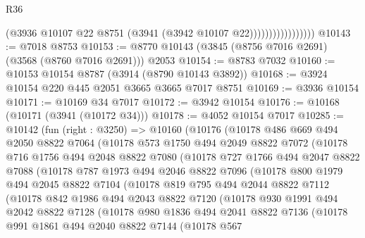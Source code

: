 \begin{lexlean}{R36}
\begin{coremodule}
                                (@3936 @10107 @22 @8751 (@3941 (@3942 @10107 @22)))))))))))))))))
@10143 := @7018 @8753
@10153 := @8770 @10143 (@3845 (@8756 @7016 @2691) (@3568 (@8760 @7016 @2691))) @2053
@10154 := @8783 @7032
@10160 := @10153 @10154 @8787 (@3914 (@8790 @10143 @3892))
@10168 := @3924 @10154 @220 @445 @2051 @3665 @3665 @7017 @8751
@10169 := @3936 @10154
@10171 := @10169 @34 @7017
@10172 := @3942 @10154
@10176 := @10168 (@10171 (@3941 (@10172 @34)))
@10178 := @4052 @10154 @7017
@10285 := @10142
    (fun (right : @3250) =>
    @10160
      (@10176
        (@10178
          @486
          @669
          @494
          @2050
          @8822
          @7064
          (@10178
            @573
            @1750
            @494
            @2049
            @8822
            @7072
            (@10178
              @716
              @1756
              @494
              @2048
              @8822
              @7080
              (@10178
                @727
                @1766
                @494
                @2047
                @8822
                @7088
                (@10178
                  @787
                  @1973
                  @494
                  @2046
                  @8822
                  @7096
                  (@10178
                    @800
                    @1979
                    @494
                    @2045
                    @8822
                    @7104
                    (@10178
                      @819
                      @795
                      @494
                      @2044
                      @8822
                      @7112
                      (@10178
                        @842
                        @1986
                        @494
                        @2043
                        @8822
                        @7120
                        (@10178
                          @930
                          @1991
                          @494
                          @2042
                          @8822
                          @7128
                          (@10178
                            @980
                            @1836
                            @494
                            @2041
                            @8822
                            @7136
                            (@10178
                              @991
                              @1861
                              @494
                              @2040
                              @8822
                              @7144
                              (@10178
                                @567

\end{coremodule}
\end{lexlean}
